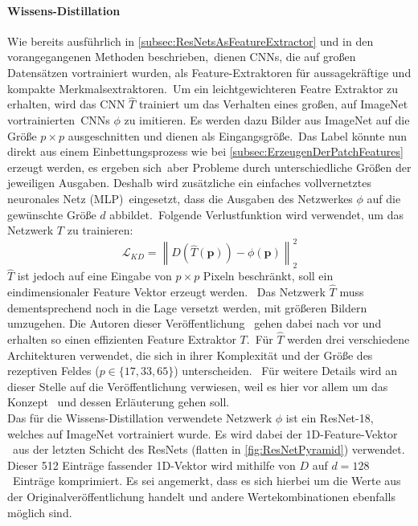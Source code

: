 \paragraph*{Wissens-Distillation}\label{par:wissensdistillation}
Wie bereits ausführlich in \ref{subsec:ResNetsAsFeatureExtractor} und in den vorangegangenen Methoden beschrieben,\
dienen CNNs, die auf großen Datensätzen vortrainiert wurden, als Feature-Extraktoren für aussagekräftige und kompakte Merkmalsextraktoren.\
Um ein leichtgewichteren Featre Extraktor zu erhalten, wird das CNN $\hat{T}$ trainiert um das Verhalten eines großen, auf ImageNet vortrainierten\
CNNs $\phi$ zu imitieren. Es werden dazu Bilder aus ImageNet auf die Größe $p\times p$ ausgeschnitten und dienen als Eingangsgröße.\
Das Label könnte nun direkt aus einem Einbettungsprozess wie bei \ref{subsec:ErzeugenDerPatchFeatures} erzeugt werden, es ergeben sich\
aber Probleme durch unterschiedliche Größen der jeweiligen Ausgaben. Deshalb wird zusätzliche ein einfaches vollvernetztes neuronales Netz (MLP)\
eingesetzt, dass die Ausgaben des Netzwerkes $\phi$ auf die gewünschte Größe $d$ abbildet.\
Folgende Verlustfunktion wird verwendet, um das Netzwerk $T$ zu trainieren:\
$$
\mathcal{L}_{KD} = \left\lVert D(\hat{T}(\mathbf{p}))-\phi(\mathbf{p}) \right\rVert_{2}^{2}
$$
$\hat{T}$ ist jedoch auf eine Eingabe von $p\times p$ Pixeln beschränkt, soll ein eindimensionaler Feature Vektor erzeugt werden. \
Das Netzwerk $\hat{T}$ muss dementsprechend noch in die Lage versetzt werden, mit größeren Bildern umzugehen. Die Autoren dieser Veröffentlichung \
gehen dabei nach \cite{bailer2018fast} vor und erhalten so einen effizienten Feature Extraktor $T$.\
Für $\hat{T}$ werden drei verschiedene Architekturen verwendet, die sich in ihrer Komplexität und der Größe des rezeptiven Feldes ($p\in\{17,33,65\}$) unterscheiden. \
Für weitere Details wird an dieser Stelle auf die Veröffentlichung \cite{bailer2018fast} verwiesen, weil es hier vor allem um das Konzept \
und dessen Erläuterung gehen soll.\\
Das für die Wissens-Distillation verwendete Netzwerk $\phi$ ist ein ResNet-18, welches auf ImageNet vortrainiert wurde. Es wird dabei der 1D-Feature-Vektor \
aus der letzten Schicht des ResNets (\glqq flatten\grqq{} in \ref{fig:ResNetPyramid}) verwendet. Dieser 512 Einträge fassender 1D-Vektor wird mithilfe von $D$ auf $d=128$\
Einträge komprimiert. Es sei angemerkt, dass es sich hierbei um die Werte aus der Originalveröffentlichung handelt und andere Wertekombinationen ebenfalls möglich sind. \
